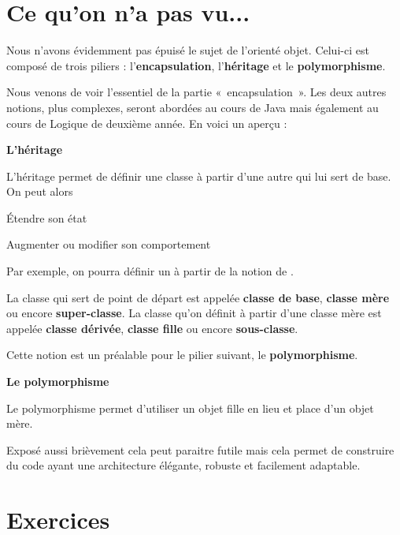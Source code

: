 \section{Ce qu'on n'a pas vu...}

Nous n'avons évidemment pas épuisé le sujet de
l'orienté objet. Celui-ci est composé de trois piliers
: l'\textbf{encapsulation},
l'\textbf{héritage} et le \textbf{polymorphisme}.

Nous venons de voir l'essentiel de la partie
«~encapsulation~». Les deux autres notions, plus complexes, seront
abordées au cours de Java mais également au cours de Logique de
deuxième année. En voici un aperçu :

{\sffamily\bfseries\upshape
L'héritage}

{L’héritage permet de définir une classe à partir d’une autre qui lui
sert de base.} 
On peut alors

\begin{liste}
	\item {
		Étendre son état}
	\item {
		Augmenter ou modifier son comportement}
\end{liste}

Par exemple, on pourra définir un  à partir
de la notion de .

La classe qui sert de point de départ est appelée \textbf{classe de
base}, \textbf{classe mère} ou encore \textbf{super-classe}. La classe
qu’on définit à partir d’une classe mère est appelée \textbf{classe
dérivée}, \textbf{classe fille} ou encore \textbf{sous-classe}.

Cette notion est un préalable pour le pilier suivant, le
\textbf{polymorphisme}.

{\sffamily\bfseries\upshape
Le polymorphisme}

{
Le polymorphisme permet d’utiliser un objet fille en lieu et place d’un
objet mère.} 

{Exposé aussi brièvement cela peut paraitre futile mais cela
permet de construire du code ayant une architecture élégante, robuste
et facilement adaptable.}


\section{Exercices}


